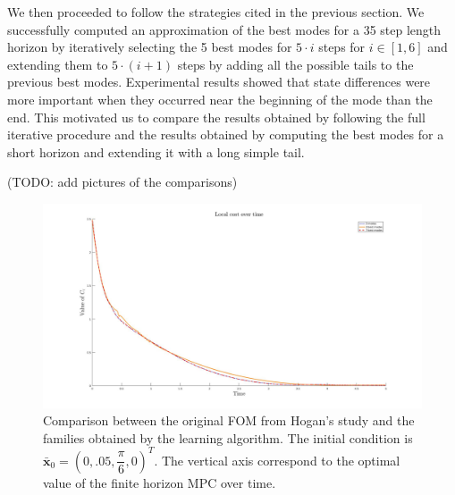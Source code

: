 \documentclass[12,twoside]{TFG-GM}
\theoremstyle{definition}
\theoremstyle{remark}
\newcommand*\diff[1]{\bar{#1}}
\begin{document}
We then proceeded to follow the strategies cited in the previous section. We successfully computed an approximation of the best modes for a 35 step length horizon by iteratively selecting the 5 best modes for $5 \cdot i$ steps for $i \in [1, 6]$ and extending them to $5 \cdot (i + 1)$ steps by adding all the possible tails to the previous best modes. Experimental results showed that state differences were more important when they occurred near the beginning of the mode than the end. This motivated us to compare the results obtained by following the full iterative procedure and the results obtained by computing the best modes for a short horizon and extending it with a long simple tail.

(TODO: add pictures of the comparisons)

\begin{figure}[htb!]
\begin{center}
\includegraphics[width=16cm]{learning_straight.jpg}
\caption{\label{fig:cost_over_time_line} \small Comparison between the original FOM from Hogan's study and the families obtained by the learning algorithm. The initial condition is $\diff{\textbf{x}}_0 = (0, .05, \dfrac{\pi}{6}, 0)^T$. The vertical axis correspond to the optimal value of the finite horizon MPC over time.}
\end{center}
\end{figure}
\end{document}
